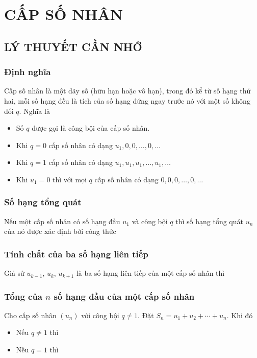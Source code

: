 \newpage
\setcounter{dang}{0}
\section{CẤP SỐ NHÂN}
\subsection{LÝ THUYẾT CẦN NHỚ}
\subsubsection{Định nghĩa}
Cấp số nhân là một dãy số (hữu hạn hoặc vô hạn), trong đó kể từ số hạng thứ hai, mỗi số hạng đều là tích của số hạng đứng ngay trước nó với một số không đổi $q$. Nghĩa là
\begin{note}
	\begin{itemize}
		\item [$\bullet$] Số $q$ được gọi là công bội của cấp số nhân.
		\item [$\bullet$] Khi $q=0$ cấp số nhân có dạng ${{u}_{1}},0,0,\ldots,0,\ldots$
		\item [$\bullet$] Khi $q=1$ cấp số nhân có dạng ${{u}_{1}},{{u}_{1}},{{u}_{1}},\ldots,{{u}_{1}},\ldots$
		\item [$\bullet$] Khi ${{u}_{1}}=0$ thì với mọi $q$ cấp số nhân có dạng $0,0,0,\ldots,0,\ldots$
	\end{itemize}
\end{note}

\subsubsection{Số hạng tổng quát} 
	Nếu một cấp số nhân có số hạng đầu $u_1$ và công bội $q$ thì số hạng tổng quát $u_n$ của nó được xác định bởi công thức
\subsubsection{Tính chất của ba số hạng liên tiếp} 
Giả sử $u_{k-1}$, $u_k$, $u_{k+1}$ là ba số hạng liên tiếp của một cấp số nhân thì 
\subsubsection{Tổng của $ n $ số hạng đầu của một cấp số nhân}
Cho cấp số nhân $\left(u_n\right)$ với công bội $q \neq 1$. Đặt $S_n=u_1+u_2+\cdots+u_n$. Khi đó
\begin{itemize}
	\item [$\bullet$] Nếu $q \ne 1$ thì 
	\item [$\bullet$] Nếu $ q=1 $ thì 
\end{itemize}
\newpage
